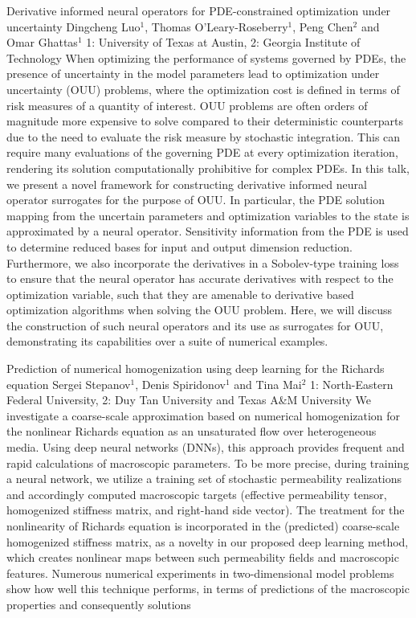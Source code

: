 \begin{addmargin}[2em]{0em}
\vspace{1.5ex}
\abs
{Derivative informed neural operators for PDE-constrained optimization under uncertainty}
{Dingcheng Luo$^1$, Thomas O'Leary-Roseberry$^1$, Peng Chen$^2$ and Omar Ghattas$^1$}
{1: University of Texas at Austin, 2: Georgia Institute of Technology}
{When optimizing the performance of systems governed by PDEs, the presence of uncertainty in the model parameters lead to optimization under uncertainty (OUU) problems, where the optimization cost is defined in terms of risk measures of a quantity of interest. OUU problems are often orders of magnitude more expensive to solve compared to their deterministic counterparts due to the need to evaluate the risk measure by stochastic integration. This can require many evaluations of the governing PDE at every optimization iteration, rendering its solution computationally prohibitive for complex PDEs. In this talk, we present a novel framework for constructing derivative informed neural operator surrogates for the purpose of OUU. In particular, the PDE solution mapping from the uncertain parameters and optimization variables to the state is approximated by a neural operator. Sensitivity information from the PDE is used to determine reduced bases for input and output dimension reduction. Furthermore, we also incorporate the derivatives in a Sobolev-type training loss to ensure that the neural operator has accurate derivatives with respect to the optimization variable, such that they are amenable to derivative based optimization algorithms when solving the OUU problem. Here, we will discuss the construction of such neural operators and its use as surrogates for OUU, demonstrating its capabilities over a suite of numerical examples.}


\vspace{1.5ex}
\abs
{Prediction of numerical homogenization using deep learning for the Richards equation}
{Sergei Stepanov$^1$, Denis Spiridonov$^1$ and Tina Mai$^2$}
{1: North-Eastern Federal University, 2: Duy Tan University and Texas A\&M University}
{We investigate a coarse-scale approximation based on numerical homogenization for the nonlinear Richards equation as an unsaturated flow over heterogeneous media. Using deep neural networks (DNNs), this approach provides frequent and rapid calculations of macroscopic parameters. To be more precise, during training a neural network, we utilize a training set of stochastic permeability realizations and accordingly computed macroscopic targets (effective permeability tensor, homogenized stiffness matrix, and right-hand side vector). The treatment for the nonlinearity of Richards equation is incorporated in the (predicted) coarse-scale homogenized stiffness matrix, as a novelty in our proposed deep learning method, which creates nonlinear maps between such permeability fields and macroscopic features. Numerous numerical experiments in two-dimensional model problems show how well this technique performs, in terms of predictions of the macroscopic properties and consequently solutions}



\end{addmargin}
